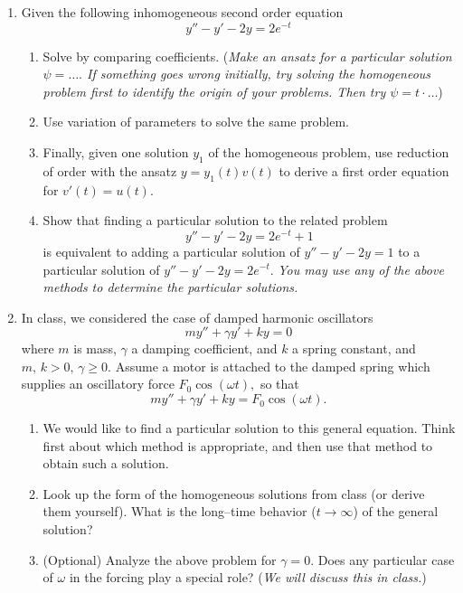 \documentclass[a4paper,10pt,reqno]{article}
\begin{document}

\begin{enumerate}
\item Given the following inhomogeneous second order equation
\[ y'' - y' - 2y = 2 e^{-t} \]
\begin{enumerate}
\item Solve by comparing coefficients. (\emph{Make an ansatz for a particular solution $\psi = \ldots.$ If something goes wrong initially, try solving the homogeneous problem first to identify the origin of your problems. Then try $\psi = t \cdot \ldots$})
\item Use variation of parameters to solve the same problem.
\item Finally, given one solution $y_1$ of the homogeneous problem, use reduction of order with the ansatz $y = y_1(t) v(t)$ to derive a first order equation for $v'(t) = u(t).$ 
\item Show that finding a particular solution to the related problem \[ y'' - y' - 2y = 2 e^{-t} + 1 \]
is equivalent to adding a particular solution of 
$ y'' - y' - 2y = 1 $ to a particular solution of $y'' - y' - 2y = 2 e^{-t}.$ \emph{You may use any of the above methods to determine the particular solutions.}

\end{enumerate}
\item In class, we considered the case of damped harmonic oscillators
\[ m y'' + \gamma y' + k y = 0 \]
where $m$ is mass, $\gamma$ a damping coefficient, and $k$ a spring constant, and $m, \, k > 0, \, \gamma \geq 0$. Assume a motor is attached to the damped spring which supplies an oscillatory force $F_0 \cos(\omega t),$ so that 
\[ m y'' + \gamma y' + k y = F_0 \cos(\omega t). \]
\begin{enumerate}
\item We would like to find a particular solution to this general equation. Think first about which method is appropriate, and then use that method to obtain such a solution.
\item Look up the form of the homogeneous solutions from class (or derive them yourself). What is the long--time behavior ($t \rightarrow \infty$) of the general solution?
\item (Optional) Analyze the above problem for $\gamma = 0.$ Does any particular case of $\omega$ in the forcing play a special role? (\emph{We will discuss this in class.})
\end{enumerate}
\end{enumerate}
\end{document}
